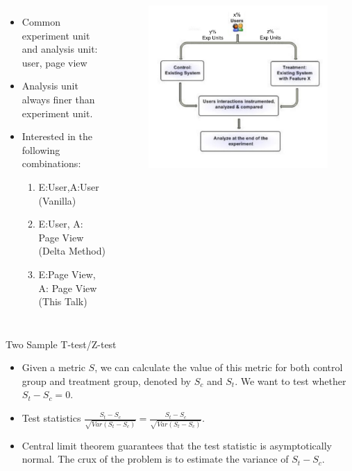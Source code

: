 \documentclass[xcolor=x11names,table]{beamer}
\newcommand{\var}{Var}
\begin{document}
\begin{frame}
\begin{columns}[t]
\column{2in}
\begin{itemize}
\item Common experiment unit and analysis unit: user, page view
\item Analysis unit always finer than experiment unit. 
\item Interested in the following combinations:
\begin{enumerate}
\item E:User,A:User (Vanilla) 
\item E:User, A: Page View (Delta Method)
\item E:Page View, A: Page View (This Talk)	
\end{enumerate}
\end{itemize}
\column{2in}
\begin{figure}[!htbp]
  \centering
  \includegraphics[width=1.2\textwidth]{split2}
\end{figure}
\end{columns}

\end{frame}

\begin{frame}{Two Sample T-test/Z-test}
\begin{itemize}
\item Given a metric $S$, we can calculate the value of this metric for both control group and treatment group, denoted by $S_c$ and $S_t$. We want to test whether $S_t-S_c=0$. 
\item Test statistics $\frac{S_t-S_c}{\sqrt{\var(S_t-S_c)}} =\frac{S_t-S_c}{\sqrt{\var (S_t-S_c)}}$. 
\item Central limit theorem guarantees that the test statistic is asymptotically normal. The crux of the problem is to estimate the variance of $S_t-S_c$.
\end{itemize}
\end{frame}
\end{document}
